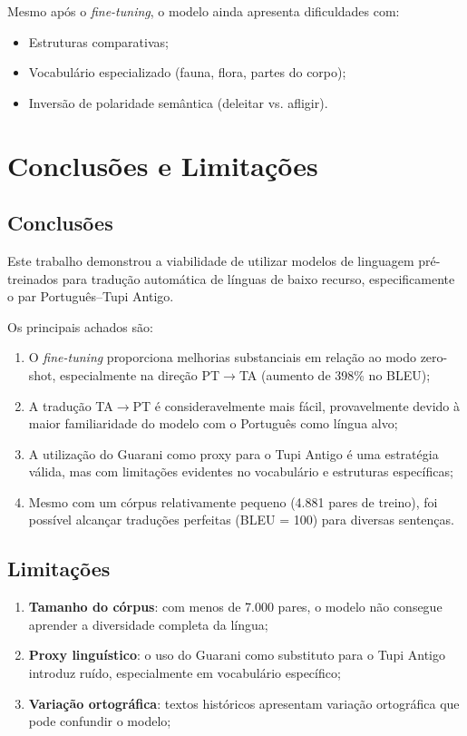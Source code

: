 \documentclass[12pt,a4paper]{article}
\begin{document}
Mesmo após o \textit{fine-tuning}, o modelo ainda apresenta dificuldades com:
\begin{itemize}
    \item Estruturas comparativas;
    \item Vocabulário especializado (fauna, flora, partes do corpo);
    \item Inversão de polaridade semântica (deleitar vs. afligir).
\end{itemize}

\section{Conclusões e Limitações}

\subsection{Conclusões}

Este trabalho demonstrou a viabilidade de utilizar modelos de linguagem pré-treinados para tradução automática de línguas de baixo recurso, especificamente o par Português--Tupi Antigo.

Os principais achados são:

\begin{enumerate}
    \item O \textit{fine-tuning} proporciona melhorias substanciais em relação ao modo zero-shot, especialmente na direção PT$\rightarrow$TA (aumento de 398\% no BLEU);
    
    \item A tradução TA$\rightarrow$PT é consideravelmente mais fácil, provavelmente devido à maior familiaridade do modelo com o Português como língua alvo;
    
    \item A utilização do Guarani como proxy para o Tupi Antigo é uma estratégia válida, mas com limitações evidentes no vocabulário e estruturas específicas;
    
    \item Mesmo com um córpus relativamente pequeno (4.881 pares de treino), foi possível alcançar traduções perfeitas (BLEU = 100) para diversas sentenças.
\end{enumerate}

\subsection{Limitações}

\begin{enumerate}
    \item \textbf{Tamanho do córpus}: com menos de 7.000 pares, o modelo não consegue aprender a diversidade completa da língua;
    
    \item \textbf{Proxy linguístico}: o uso do Guarani como substituto para o Tupi Antigo introduz ruído, especialmente em vocabulário específico;
    
    \item \textbf{Variação ortográfica}: textos históricos apresentam variação ortográfica que pode confundir o modelo;
\end{enumerate}
\end{document}
